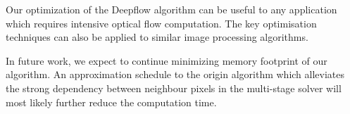 \documentclass[letterpaper]{article}
\begin{document}
Our optimization of the Deepflow algorithm can be useful to any 
application which requires intensive optical flow computation. 
The key optimisation techniques can also be applied to similar image 
processing algorithms. 

In future work, we expect to continue minimizing memory footprint of our 
algorithm. An approximation schedule to the origin algorithm which alleviates the strong dependency between neighbour pixels in the multi-stage solver will most likely further reduce the computation time. 



\end{document}
